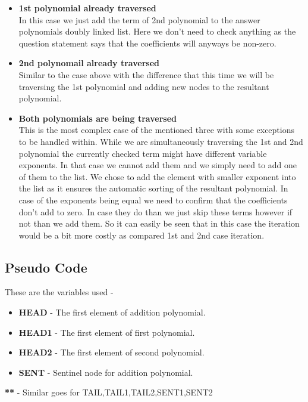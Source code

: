 \documentclass[20pt]{article}
\begin{document}
\begin{itemize}
\item \textbf{1st polynomial already traversed}
\\
In this case we just add the term of 2nd polynomial to the answer polynomials doubly linked list. Here we don't need to check anything as the question statement says that the coefficients will anyways be non-zero.

\item \textbf{2nd polynomail already traversed}
\\
Similar to the case above with the difference that this time we will be traversing the 1st polynomial and adding new nodes to the resultant polynomial.

\item \textbf{Both polynomials are being traversed}
\\
This is the most complex case of the mentioned three with some exceptions to be handled within. While we are simultaneously traversing the 1st and 2nd polynomial the currently checked term might have different variable exponents. In that case we cannot add them and we simply need to add one of them to the list. We chose to add the element with smaller exponent into the list as it ensures the automatic sorting of the resultant polynomial.
In case of the exponents being equal we need to confirm that the coefficients don't add to zero. In case they do than we just skip these terms however if not than we add them.
So it can easily be seen that in this case the iteration would be a bit more costly as compared 1st and 2nd case iteration.
\end{itemize}

\subsection{Pseudo Code}
These are the variables used - 
\begin{itemize}
\item \textbf{HEAD}   - The first element of addition polynomial.
\item \textbf{HEAD1} - The first element of first polynomial.
\item \textbf{HEAD2} - The first element of second polynomial.
\item \textbf{SENT}   - Sentinel node for addition polynomial.
\end{itemize}
\textbf{**} - Similar goes for {TAIL,TAIL1,TAIL2,SENT1,SENT2}

\begin{algorithm}

	\KwIn{}
	\KwOut{}	
\end{algorithm}
\end{document}
